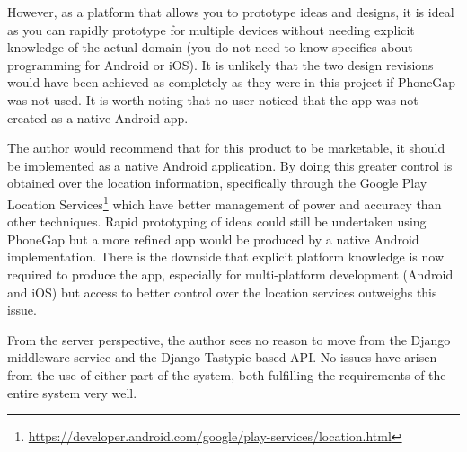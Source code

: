 However, as a platform that allows you to prototype ideas and designs,
it is ideal as you can rapidly prototype for multiple devices without
needing explicit knowledge of the actual domain (you do not need to
know specifics about programming for Android or iOS). It is unlikely
that the two design revisions would have been achieved as completely
as they were in this project if PhoneGap was not used. It is worth
noting that no user noticed that the app was not created as a native
Android app.

The author would recommend that for this product to be marketable, it
should be implemented as a native Android application. By doing this
greater control is obtained over the location information,
specifically through the Google Play Location
Services\footnote{\url{https://developer.android.com/google/play-services/location.html}}
which have better management of power and accuracy than other
techniques. Rapid prototyping of ideas could still be undertaken using
PhoneGap but a more refined app would be produced by a native Android
implementation. There is the downside that explicit platform knowledge
is now required to produce the app, especially for multi-platform
development (Android and iOS) but access to better control over the
location services outweighs this issue. 

From the server perspective, the author sees no reason to move from
the Django middleware service and the Django-Tastypie based API. No
issues have arisen from the use of either part of the system, both
fulfilling the requirements of the entire system very well. 
